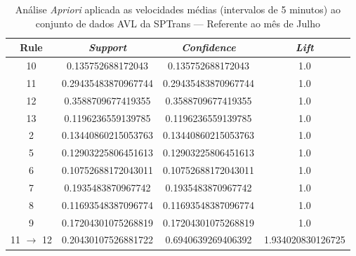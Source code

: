 \documentclass[
	12pt,				%
	oneside,			%
	a4paper,			%
	english,			%
	brazil				%
	]{abntex2ppgsi}
\begin{document}
\begin{apendicesenv}
\begin{table}[!htb]
\centering
\caption {Análise \textit{Apriori} aplicada as velocidades médias (intervalos de 5 minutos) ao conjunto de dados AVL da SPTrans --- Referente ao mês de Julho}
\label {tab:aprioriJuly}
\begin{tabular}{c|c|c|c}
\hline
\textbf{Rule} & \textit{\textbf{Support}} & \textit{\textbf{Confidence}} & \textit{\textbf{Lift}} \\
\hline
10 &  0.135752688172043 &  0.135752688172043 &  1.0\\
\hline
11 &  0.29435483870967744 &  0.29435483870967744 &  1.0\\
\hline
12 &  0.3588709677419355 &  0.3588709677419355 &  1.0\\
\hline
13 &  0.1196236559139785 &  0.1196236559139785 &  1.0\\
\hline
2 &  0.13440860215053763 &  0.13440860215053763 &  1.0\\
\hline
5 &  0.12903225806451613 &  0.12903225806451613 &  1.0\\
\hline
6 &  0.10752688172043011 &  0.10752688172043011 &  1.0\\
\hline
7 &  0.1935483870967742 &  0.1935483870967742 &  1.0\\
\hline
8 &  0.11693548387096774 &  0.11693548387096774 &  1.0\\
\hline
9 &  0.17204301075268819 &  0.17204301075268819 &  1.0\\
\hline
11 $\rightarrow$ 12 &  0.20430107526881722 &  0.6940639269406392 &  1.934020830126725\\
\hline
\end{tabular}
\end{table}


\end{apendicesenv}
\end{document}
